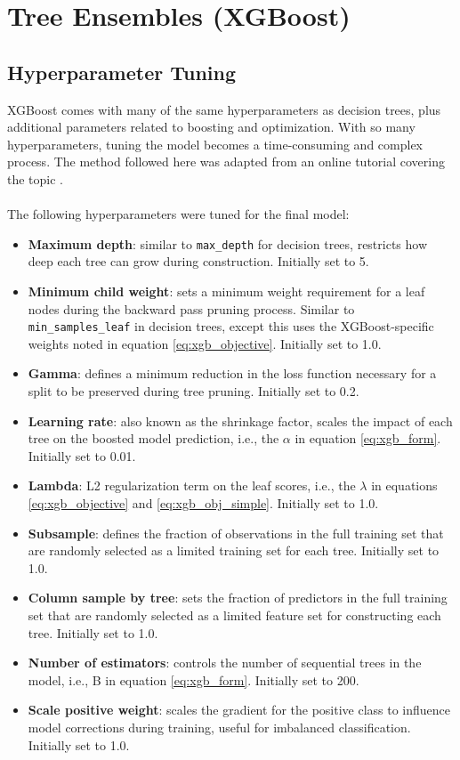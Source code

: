 \section{Tree Ensembles (XGBoost)}\label{ch5:xgb_model}
\subsection{Hyperparameter Tuning}\label{ch5:xgb_tuning}
XGBoost comes with many of the same hyperparameters as decision trees, plus additional parameters related to boosting and optimization. With so many hyperparameters, tuning the model becomes a time-consuming and complex process. The method followed here was adapted from an online tutorial covering the topic \citep{jain_xgboost_2016}.
\\
\\
The following hyperparameters were tuned for the final model:
\begin{itemize}[itemsep=2pt]
    \item \textbf{Maximum depth}: similar to \verb|max_depth| for decision trees, restricts how deep each tree can grow during construction. Initially set to 5.
    \item \textbf{Minimum child weight}: sets a minimum weight requirement for a leaf nodes during the backward pass pruning process. Similar to \verb|min_samples_leaf| in decision trees, except this uses the XGBoost-specific weights noted in equation \ref{eq:xgb_objective}. Initially set to 1.0.
    \item \textbf{Gamma}: defines a minimum reduction in the loss function necessary for a split to be preserved during tree pruning. Initially set to 0.2.
    \item \textbf{Learning rate}: also known as the shrinkage factor, scales the impact of each tree on the boosted model prediction, i.e., the $\alpha$ in equation \ref{eq:xgb_form}. Initially set to 0.01.
    \item \textbf{Lambda}: L2 regularization term on the leaf scores, i.e., the $\lambda$ in equations \ref{eq:xgb_objective} and \ref{eq:xgb_obj_simple}. Initially set to 1.0.
    \item \textbf{Subsample}: defines the fraction of observations in the full training set that are randomly selected as a limited training set for each tree. Initially set to 1.0.
    \item \textbf{Column sample by tree}: sets the fraction of predictors in the full training set that are randomly selected as a limited feature set for constructing each tree. Initially set to 1.0.
    \item \textbf{Number of estimators}: controls the number of sequential trees in the model, i.e., B in equation \ref{eq:xgb_form}. Initially set to 200.
    \item \textbf{Scale positive weight}: scales the gradient for the positive class to influence model corrections during training, useful for imbalanced classification. Initially set to 1.0.
\end{itemize}

